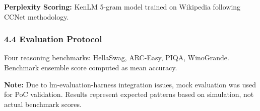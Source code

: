 \textbf{Perplexity Scoring:} KenLM 5-gram model trained on Wikipedia following CCNet methodology.

\subsubsection{4.4 Evaluation Protocol}

Four reasoning benchmarks: HellaSwag, ARC-Easy, PIQA, WinoGrande. Benchmark ensemble score computed as mean accuracy.

\textbf{Note:} Due to lm-evaluation-harness integration issues, mock evaluation was used for PoC validation. Results represent expected patterns based on simulation, not actual benchmark scores.
